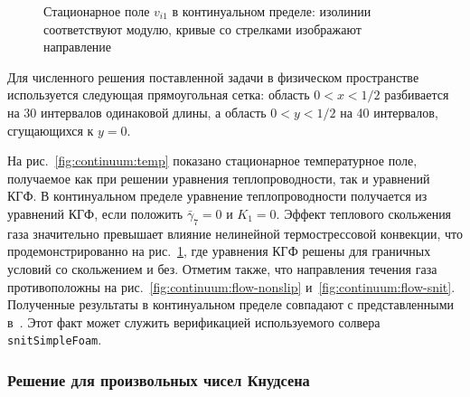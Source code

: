\documentclass[
aps,%
12pt,%
final,%
notitlepage,%
oneside,%
onecolumn,%
nobibnotes,%
nofootinbib,%
superscriptaddress,%
noshowpacs,%
showkeys,%
tightenlines,%
centertags]%
{revtex4}
\begin{document}
\begin{figure}
    \centering
    \caption{Стационарное поле \(v_{i1}\) в континуальном пределе:
        изолинии соответствуют модулю, кривые со стрелками изображают направление}
    \label{fig:continuum:flow}
\end{figure}

Для численного решения поставленной задачи в физическом пространстве
используется следующая прямоугольная сетка:
область \(0<x<1/2\) разбивается на 30 интервалов одинаковой длины,
а область \(0<y<1/2\) на 40 интервалов, сгущающихся к \(y=0\).

На рис.~\ref{fig:continuum:temp} показано стационарное температурное поле,
получаемое как при решении уравнения теплопроводности, так и уравнений КГФ.
В континуальном пределе уравнение теплопроводности получается из уравнений КГФ,
если положить \(\bar{\gamma}_7=0\) и \(K_1=0\).
Эффект теплового скольжения газа значительно превышает влияние нелинейной термострессовой конвекции,
что продемонстрированно на рис.~\ref{fig:continuum:flow}, где уравнения КГФ решены
для граничных условий со скольжением и без.
Отметим также, что направления течения газа противоположны на рис.~\ref{fig:continuum:flow-nonslip}
и~\ref{fig:continuum:flow-snit}.
Полученные результаты в континуальном пределе совпадают с представленными в~\cite{Sone1996}.
Этот факт может служить верификацией используемого солвера \verb+snitSimpleFoam+.

\subsubsection{Решение для произвольных чисел Кнудсена}
\end{document}
